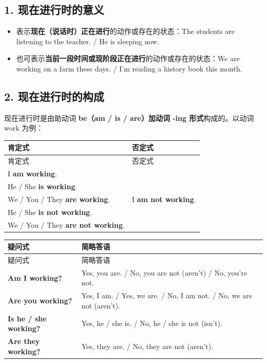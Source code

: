 \documentclass[11pt,a4paper]{ctexart}
\begin{document}
\subsection*{1. 现在进行时的意义}

\begin{itemize}[leftmargin=1.4em]
\item 表示\textbf{现在（说话时）正在进行}的动作或存在的状态：The students are listening to the teacher. / He is sleeping now.
\item 也可表示\textbf{当前一段时间或现阶段正在进行}的动作或存在的状态：We are working on a farm these days. / I’m reading a history book this month.
\end{itemize}

\subsection*{2. 现在进行时的构成}

现在进行时是由助动词 \textbf{be（am / is / are）加动词 -ing 形式}构成的。以动词 work 为例：

{\footnotesize
\begin{longtable}{p{6.70cm}p{6.70cm}}
\hline
肯定式 & 否定式 \\
\hline
\endfirsthead
\hline
肯定式 & 否定式 \\
\hline
\endhead
\hline
\endfoot
I \textbf{am working}.\\ He / She \textbf{is working}.\\ We / You / They \textbf{are working}. & I \textbf{am not working}.\\ He / She \textbf{is not working}.\\ We / You / They \textbf{are not working}. \\
\end{longtable}
}

{\footnotesize
\begin{longtable}{p{6.70cm}p{6.70cm}}
\hline
疑问式 & 简略答语 \\
\hline
\endfirsthead
\hline
疑问式 & 简略答语 \\
\hline
\endhead
\hline
\endfoot
\textbf{Am I working?} & Yes, you are. / No, you are not (aren’t) / No, you’re not. \\
\textbf{Are you working?} & Yes, I am. / Yes, we are. / No, I am not. / No, we are not (aren’t). \\
\textbf{Is he / she working?} & Yes, he / she is. / No, he / she is not (isn’t). \\
\textbf{Are they working?} & Yes, they are. / No, they are not (aren’t). \\
\end{longtable}
}
\end{document}
